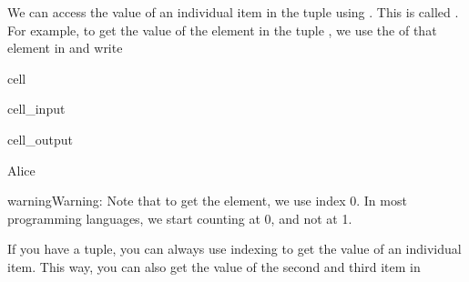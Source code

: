 \documentclass[letterpaper,10pt,english]{jupyterBook}
\begin{document}
\sphinxAtStartPar
We can access the value of an individual item in the tuple using \sphinxcode{\sphinxupquote{{[}{]}}}. This is called . For example, to get the value of the  element in the tuple , we use the  of that element in  and write

\begin{sphinxuseclass}{cell}\begin{sphinxVerbatimInput}

\begin{sphinxuseclass}{cell_input}
\begin{sphinxVerbatim}[commandchars=\\\{\}]
\PYG{p}{[}\PYG{p}{]}
\end{sphinxVerbatim}

\end{sphinxuseclass}\end{sphinxVerbatimInput}
\begin{sphinxVerbatimOutput}

\begin{sphinxuseclass}{cell_output}
\begin{sphinxVerbatim}[commandchars=\\\{\}]
Alice
\end{sphinxVerbatim}

\end{sphinxuseclass}\end{sphinxVerbatimOutput}

\end{sphinxuseclass}
\begin{sphinxadmonition}{warning}{Warning:}
\sphinxAtStartPar
Note that to get the  element, we use index 0. In most programming languages, we start counting at 0, and not at 1.
\end{sphinxadmonition}

\sphinxAtStartPar
If you have a tuple, you can always use indexing to get the value of an individual item. This way, you can also get the value of the second and third item in 
\end{document}
